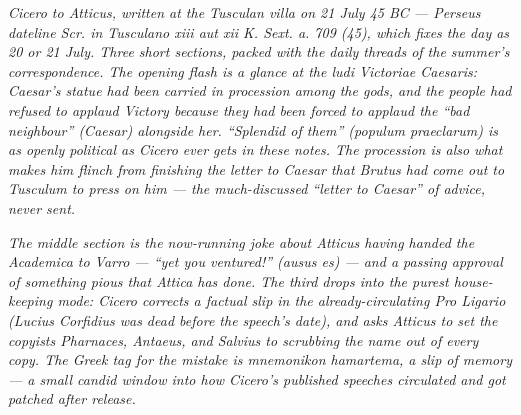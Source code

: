 
\textit{Cicero to Atticus, written at the Tusculan villa on 21
July 45 BC --- Perseus dateline \textit{Scr. in Tusculano xiii aut
xii K. Sext. a. 709 (45)}, which fixes the day as 20 or 21 July.
Three short sections, packed with the daily threads of the
summer's correspondence. The opening flash is a glance at the
\textit{ludi Victoriae Caesaris}: Caesar's statue had been carried
in procession among the gods, and the people had refused to
applaud Victory because they had been forced to applaud the
``bad neighbour'' (Caesar) alongside her. ``Splendid of them''
(\textit{populum praeclarum}) is as openly political as Cicero
ever gets in these notes. The procession is also what makes him
flinch from finishing the letter to Caesar that Brutus had come
out to Tusculum to press on him --- the much-discussed
``letter to Caesar'' of advice, never sent.}

\textit{The middle section is the now-running joke about Atticus
having handed the \textit{Academica} to Varro --- ``yet you
ventured!'' (\textit{ausus es}) --- and a passing approval of
something pious that Attica has done. The third drops into the
purest house-keeping mode: Cicero corrects a factual slip in the
already-circulating \textit{Pro Ligario} (Lucius Corfidius was
dead before the speech's date), and asks Atticus to set the
copyists Pharnaces, Antaeus, and Salvius to scrubbing the name
out of every copy. The Greek tag for the mistake is
\textit{mnemonikon hamartema}, a slip of memory --- a small
candid window into how Cicero's published speeches circulated
and got patched after release.}
